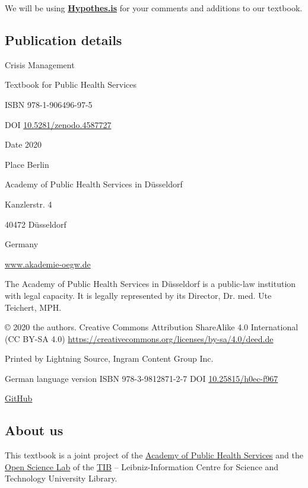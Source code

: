 \documentclass{article}
\begin{document}
We will be using \textbf{\href{https://hypothes.is/}{Hypothes.is}} for your comments and additions to our textbook.


\subsection{Publication details}\label{H8111132}



Crisis Management

Textbook for Public Health Services

ISBN 978-1-906496-97-5

DOI \href{https://zenodo.org/deposit/4587727}{10.5281/zenodo.4587727}

Date 2020

Place Berlin

Academy of Public Health Services in Düsseldorf

Kanzlerstr. 4

40472 Düsseldorf

Germany

\href{http://www.akademie-oegw.de}{www.akademie-oegw.de}


The Academy of Public Health Services in Düsseldorf is a public-law institution with legal capacity. It is legally represented by its Director, Dr. med. Ute Teichert, MPH.


© 2020 the authors. Creative Commons Attribution ShareAlike 4.0 International (CC BY-SA 4.0) \href{https://creativecommons.org/licenses/by-sa/4.0/deed.de}{https://creativecommons.org/licenses/by-sa/4.0/deed.de}

Printed by Lightning Source, Ingram Content Group Inc.


German language version ISBN 978-3-9812871-2-7 DOI \href{https://doi.org/10.25815/h0ec-f967}{10.25815/h0ec-f967}

\href{https://akademie-oeffentliches-gesundheitswesen.github.io/krisenmanagment/}{GitHub}


\subsection{About us}\label{H2129478}



This textbook is a joint project of the \href{https://www.akademie-oegw.de/startseite.html}{Academy of Public Health Services} and the \href{https://www.tib.eu/en/research-development/open-science}{Open Science Lab} of the \href{https://www.tib.eu/}{TIB} – Leibniz-Information Centre for Science and Technology University Library.
\end{document}
